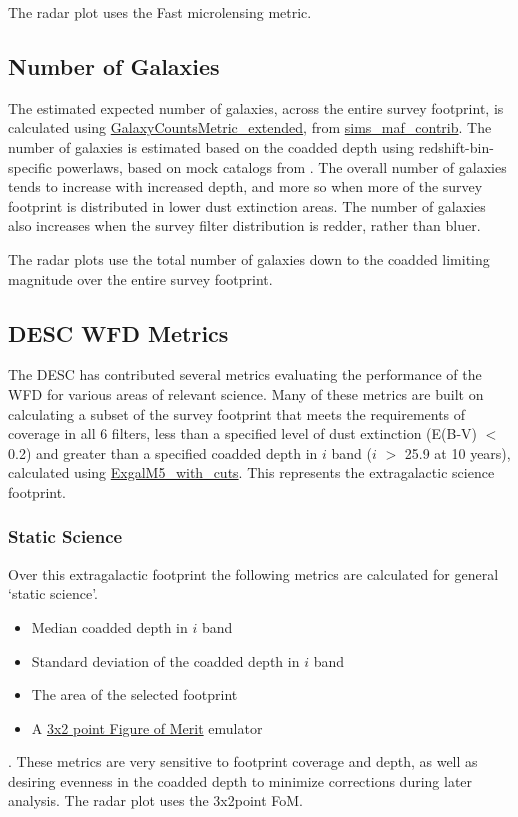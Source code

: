 The radar plot uses the Fast microlensing metric. 

\subsection{Number of Galaxies}

The estimated expected number of galaxies, across the entire survey footprint, is calculated using \href{https://github.com/LSST-nonproject/sims_maf_contrib/blob/master/mafContrib/LSSObsStrategy/galaxyCountsMetric_extended.py#L26}{GalaxyCountsMetric\_extended}, from \href{https://github.com/LSST-nonproject/sims_maf_contrib}{sims\_maf\_contrib}. The number of galaxies is estimated based on the coadded depth using redshift-bin-specific powerlaws, based on mock catalogs from \citet{2003MNRAS.343..796P}. The overall number of galaxies tends to increase with increased depth, and more so when more of the survey footprint is distributed in lower dust extinction areas. The number of galaxies also increases when the survey filter distribution is redder, rather than bluer.

The radar plots use the total number of galaxies down to the coadded limiting magnitude over the entire survey footprint.

\subsection{DESC WFD Metrics}

The DESC has contributed several metrics evaluating the performance of the WFD for various areas of relevant science. Many of these metrics are built on calculating a subset of the survey footprint that meets the requirements of coverage in all 6 filters, less than a specified level of dust extinction (E(B-V) $<$ 0.2) and greater than a specified coadded depth in $i$ band ($i$ $>$ 25.9 at 10 years), calculated using \href{https://github.com/lsst/sims_maf/blob/master/python/lsst/sims/maf/metrics/weakLensingSystematicsMetric.py#L8}{ExgalM5\_with\_cuts}. This represents the extragalactic science footprint. 

\subsubsection{Static Science}
Over this extragalactic footprint the following metrics are calculated for general `static science'.
\begin{itemize}
\item Median coadded depth in $i$ band
\item Standard deviation of the coadded depth in $i$ band
\item The area of the selected footprint
\item A \href{https://github.com/lsst/sims_maf/blob/master/python/lsst/sims/maf/metrics/summaryMetrics.py#L231}{3x2 point Figure of Merit} emulator
\end{itemize}. 
These metrics are very sensitive to footprint coverage and depth, as well as desiring evenness in the coadded depth to minimize corrections during later analysis.
The radar plot uses the 3x2point FoM. 

